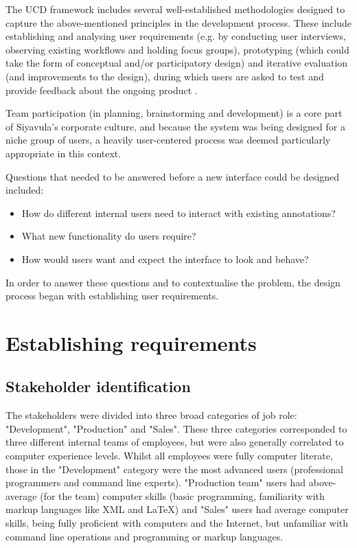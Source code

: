 The UCD framework includes several well-established methodologies designed to capture the above-mentioned principles in the development process. These include establishing and analysing user requirements (e.g. by conducting user interviews, observing existing workflows and holding focus groups), prototyping (which could take the form of conceptual and/or participatory design) and iterative evaluation (and improvements to the design), during which users are asked to test and provide feedback about the ongoing product \citep[p. 330 - 331]{RogersPreece}. 

Team participation (in planning, brainstorming and development) is a core part of Siyavula's corporate culture, and because the system was being designed for a niche group of users, a heavily user-centered process was deemed particularly appropriate in this context.

Questions that needed to be answered before a new interface could be designed included: 
\begin{itemize}
 \item How do different internal users need to interact with existing annotations? 
 \item What new functionality do users require? 
 \item How would users want and expect the interface to look and behave?
\end{itemize}

In order to answer these questions and to contextualise the problem, the design process began with establishing user requirements. 
\section{Establishing requirements}
 

\subsection{Stakeholder identification}
The stakeholders were divided into three broad categories of job role: "Development", "Production" and "Sales". These three categories corresponded to three different internal teams of employees, but were also generally correlated to computer experience levels. Whilst all employees were fully computer literate, those in the "Development" category were the most advanced users (professional programmers and command line experts). "Production team" users had above-average (for the team) computer skills (basic programming, familiarity with markup languages like XML and LaTeX) and "Sales" users had average computer skills, being fully proficient with computers and the Internet,  but unfamiliar with command line operations and programming or markup languages.


